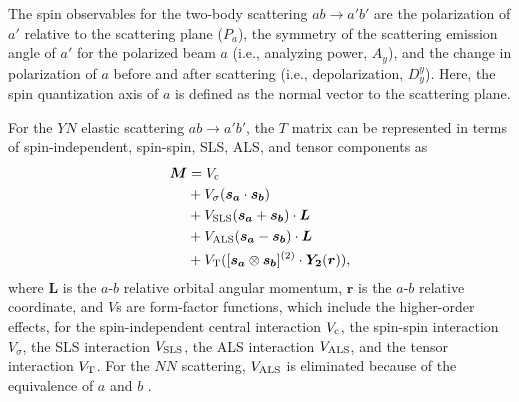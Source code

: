 The spin observables for the two-body scattering $ab\to a'b'$ are the polarization of $a'$ relative to the scattering plane ($P_a$), the symmetry of the scattering emission angle of $a'$ for the polarized beam $a$ (i.e., analyzing power, $A_y$), and the change in polarization of $a$ before and after scattering (i.e., depolarization, $D^y_y$). Here, the spin quantization axis of $a$ is defined as the normal vector to the scattering plane. 

\begin{comment}
Several models describe the $YN$ interaction. For example, there are 
\begin{itemize}
  \item {\bf Extended-Soft Core model (ESC16)} describes the short-range repulsion derived from the quark-Pauli effect phenomenologically using Pomeron exchange, etc.
  \item {\bf Quark-cluster model (QCM)} is a theory of interquark interactions to describe the repulsion.
  \item {\bf Chiral EFT} has the potential to be composed of meson exchange and contact interactions (parameterized by low-energy constants (LECs), the values of which need to be determined by fitting the scattering data) with the contribution of pseudoscalar octuplets. 
\end{itemize}
Compared to the abundance of $NN$ scattering data, $YN$ scattering data are still scarce. A robust model dependence appears in the amount of spin observed in SU(3)$_f$ space with the introduction of $s$ quarks in the model above. We plan to constrain these models by experimentally measuring the $ \Lp$ spin observables.
\end{comment}

For the $YN$ elastic scattering $ab\to a'b'$, the $T$ matrix can be represented in terms of spin-independent, spin-spin, SLS, ALS, and tensor components as
\begin{align}
  \bm{M} &= V_{\rm c} \\
  &+ V_{\sigma}(\bm{s_a} \cdot \bm{s_b}) \\
  &+ V_{{\rm SLS}}(\bm{s_a} + \bm{s_b}) \cdot \bm{L} \\
  &+ V_{{\rm ALS}}(\bm{s_a} - \bm{s_b}) \cdot \bm{L} \\
  &+V_{{\rm T}}([\bm{s_a} \otimes \bm{s_b}]^{(2)} \cdot \bm{Y_2}(\bm{r})),
\end{align}
where $\bm{L}$ is the $a$-$b$ relative orbital angular momentum, $\bm{r}$ is the $a$-$b$ relative coordinate, and $V$s are form-factor functions, which include the higher-order effects, for the spin-independent central interaction $V_{\rm c}$, the spin-spin interaction $V_{\sigma}$, the SLS interaction $V_{\rm SLS}$, the ALS interaction $V_{\rm ALS}$, and the tensor interaction $V_{\rm T}$. %
For the $NN$ scattering, $V_{\rm ALS}$ is eliminated because of the equivalence of $a$ and $b$ \cite{Ishikawa-2004}. 

